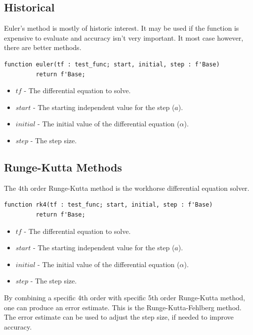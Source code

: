 \documentclass[10pt, openany]{book}
\newcommand{\indexfunc}[1]{\index[func]{#1}}
\begin{document}
\subsection{Historical}
Euler's method is mostly of historic interest.  It may be used if the function is expensive to evaluate and accuracy isn't very important.  It most case however, there are better methods.

\begin{lstlisting}
function euler(tf : test_func; start, initial, step : f'Base)
         return f'Base;
\end{lstlisting}
\indexfunc{ode-euler}
\begin{itemize}
  \item $tf$ - The differential equation to solve.
  \item $start$ - The starting independent value for the step ($a$).
  \item $initial$ - The initial value of the differential equation ($\alpha$).
  \item $step$ - The step size.
\end{itemize}

\subsection{Runge-Kutta Methods}
The 4th order Runge-Kutta method is the workhorse differential equation solver.

\begin{lstlisting}
function rk4(tf : test_func; start, initial, step : f'Base)
         return f'Base;
\end{lstlisting}
\indexfunc{ode-rk4}
\begin{itemize}
  \item $tf$ - The differential equation to solve.
  \item $start$ - The starting independent value for the step ($a$).
  \item $initial$ - The initial value of the differential equation ($\alpha$).
  \item $step$ - The step size.
\end{itemize}

By combining a specific 4th order with specific 5th order Runge-Kutta method, one can produce an error estimate.  This is the Runge-Kutta-Fehlberg method.  The error estimate can be used to adjust the step size, if needed to improve accuracy.
\end{document}
